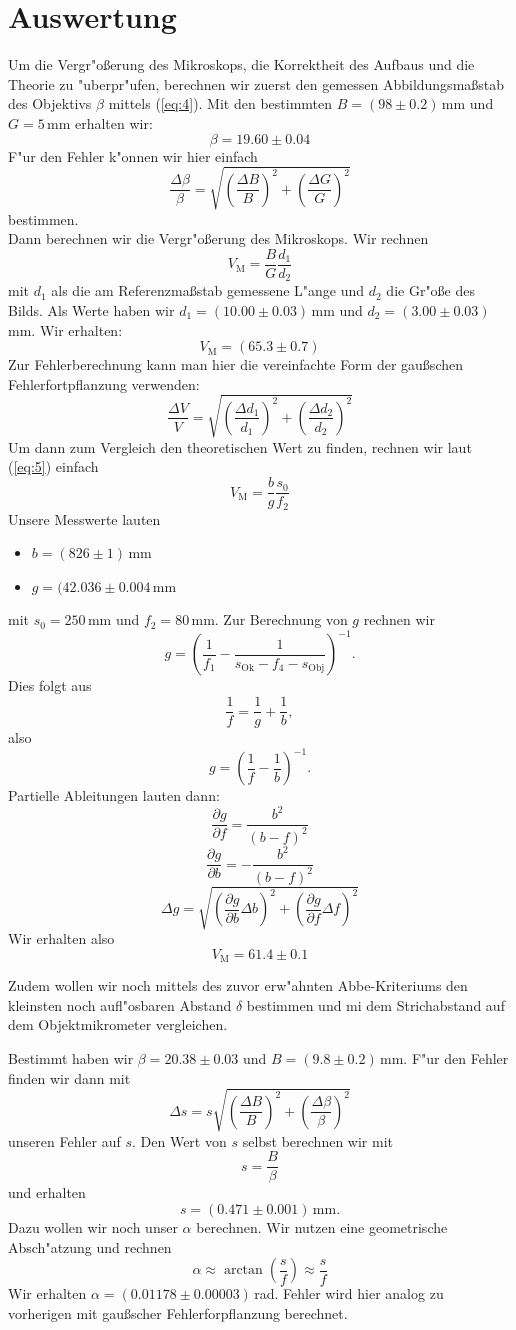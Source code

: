 \documentclass[11pt,a4paper]{article}
\begin{document}
\section{Auswertung}

Um die Vergr"o\ss erung des Mikroskops, die Korrektheit des Aufbaus und die Theorie zu "uberpr"ufen, berechnen wir zuerst den gemessen Abbildungsma\ss stab des Objektivs $\beta$ mittels (\ref{eq:4}). Mit den bestimmten $B=(98\pm0.2)\,$mm und $G=5\,$mm erhalten wir:
\[\beta=19.60\pm0.04\]
F"ur den Fehler k"onnen wir hier einfach
\[
\frac{\Delta\beta}{\beta}=\sqrt{\left(\frac{\Delta B}{B}\right)^2+\left(\frac{\Delta G}{G}\right)^2}
\]
bestimmen.\\
Dann berechnen wir die Vergr"o\ss erung des Mikroskops. Wir rechnen
\[V_\textrm{M}=\frac{B}{G}\frac{d_1}{d_2}\]
mit $d_1$ als die am Referenzma\ss stab gemessene L"ange und $d_2$ die Gr"o\ss e des Bilds. Als Werte haben wir $d_1=(10.00\pm0.03)\,$mm und $d_2=(3.00\pm0.03)\,$mm. Wir erhalten:
\[V_\textrm{M}=(65.3\pm0.7)\]
Zur Fehlerberechnung kann man hier die vereinfachte Form der gau\ss schen Fehlerfortpflanzung verwenden:
\[
\frac{\Delta V}{V}=\sqrt{\left(\frac{\Delta d_1}{d_1}\right)^2+\left(\frac{\Delta d_2}{d_2}\right)^2}
\]
Um dann zum Vergleich den theoretischen Wert zu finden, rechnen wir laut (\ref{eq:5}) einfach
\[V_\mathrm{M}=\frac{b}{g}\frac{s_0}{f_2}\]
Unsere Messwerte lauten
\begin{itemize}
\item $b=(826\pm1)\,$mm
\item $g=(42.036\pm0.004\,$mm
\end{itemize}
mit $s_0=250\,$mm und $f_2=80\,$mm. Zur Berechnung von $g$ rechnen wir
\[
g=\left(\frac{1}{f_1}-\frac{1}{s_{\mathrm{Ok}}-f_4-s_{\mathrm{Obj}}}\right)^{-1}.
\]
Dies folgt aus
\[\frac{1}{f}=\frac{1}{g}+\frac{1}{b},\]
also
\[g=\left(\frac{1}{f}-\frac{1}{b}\right)^{-1}.\]
Partielle Ableitungen lauten dann:
\[
\frac{\partial g}{\partial f}=\frac{b^2}{(b-f)^2}
\]
\[
\frac{\partial g}{\partial b}=-\frac{b^2}{(b-f)^2}
\]
\[
\Delta g=\sqrt{\left(\frac{\partial g}{\partial b}\Delta b\right)^2+\left(\frac{\partial g}{\partial f}\Delta f\right)^2}
\]
Wir erhalten also
\[V_\mathrm{M}=61.4\pm0.1\]


Zudem wollen wir noch mittels des zuvor erw"ahnten Abbe-Kriteriums den kleinsten noch aufl"osbaren Abstand $\delta$ bestimmen und mi dem Strichabstand auf dem Objektmikrometer vergleichen.

Bestimmt haben wir $\beta=20.38\pm0.03$ und $B=(9.8\pm0.2)\,$mm. F"ur den Fehler finden wir dann mit
\[\Delta s=s\sqrt{\left(\frac{\Delta B}{B}\right)^2+\left(\frac{\Delta\beta}{\beta}\right)^2}\]
unseren Fehler auf $s$. Den Wert von $s$ selbst berechnen wir mit
\[s=\frac{B}{\beta}\]
und erhalten
\[s=(0.471\pm0.001)\,\mathrm{mm}.\]
Dazu wollen wir noch unser $\alpha$ berechnen. Wir nutzen eine geometrische Absch"atzung und rechnen
\[\alpha\approx\arctan\left(\frac{s}{f}\right)\approx\frac{s}{f}\]
Wir erhalten $\alpha=(0.01178\pm0.00003)$\,rad. Fehler wird hier analog zu vorherigen mit gau\ss scher Fehlerforpflanzung berechnet.
\end{document}
